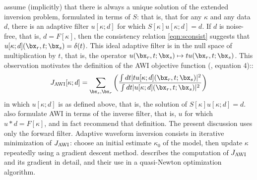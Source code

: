 

\cite{Warner:16} assume (implicitly) that there is always a unique
solution of the extended inversion problem, formulated in terms of
$S$: that is, that
for any $\kappa$ and any data $d$, there is an
adaptive filter $u[\kappa;d]$ for which
$S[\kappa]u[\kappa;d]= d$. If $d$ is noise-free, that is, $d=F[\kappa]$, then the consistency relation \ref{eqn:sconsist}
suggests that $u[\kappa;d](\bx_r,t;\bx_s) = \delta(t)$. This ideal adaptive filter is in the null
space of multiplication by $t$, that is, the operator
$u(\bx_r,t;\bx_s) \mapsto t u(\bx_r,t;\bx_s)$. This
observation motivates the definition of the AWI objective function
(\cite{Warner:16}, equation 4)::
\begin{equation}
  \label{eqn:awideforig}
  J_{\rm AWI}[\kappa;d] = \sum_{\bx_s,\bx_r} \left(\frac{\int dt |tu[\kappa;d](\bx_r,t;\bx_s)|^2}{\int dt |u[\kappa;d](\bx_r,t;\bx_s)|^2}\right) 
\end{equation}
in which $u[\kappa;d]$ is as defined above, that is, the solution of $S[\kappa]u[\kappa;d]
= d$. \cite{Warner:16} also formulate
AWI in terms of the inverse filter, that is, $u$ for which
$u*d = F[\kappa]$, and in fact recommend that definition. The present
discussion uses only the forward filter.
Adaptive waveform inversion consists in iterative minimization of
$J_{\rm AWI}$: choose an initial estimate $\kappa_0$ of the
model, then update $\kappa$ repeatedly using a gradient
descent method. \cite{Warner:16} describes the computation of $J_{\rm AWI}$
and its gradient in detail, and their use in a quasi-Newton
optimization algorithm.

